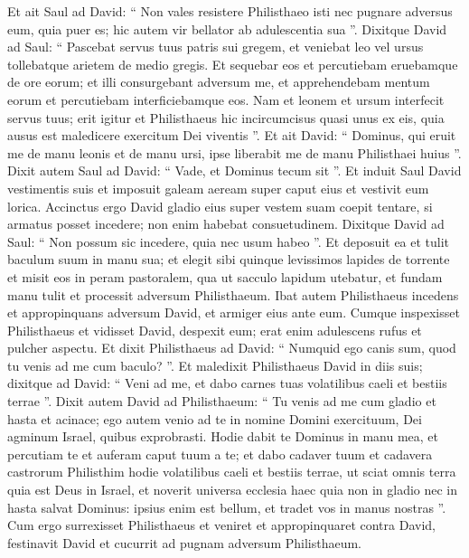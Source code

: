 \begin{biblechapter}
\begin{biblechapter}
\begin{biblechapter}
\begin{biblechapter}
\begin{biblechapter}
\begin{biblechapter}
\begin{biblechapter}
\begin{biblechapter}
\begin{biblechapter}
\begin{biblechapter}
\begin{biblechapter}
\begin{biblechapter}
\begin{biblechapter}
\begin{biblechapter}
\begin{biblechapter}
\begin{biblechapter}
\begin{biblechapter}
 \verse Et ait Saul ad David: “ Non vales resistere Philisthaeo isti nec pugnare adversus eum, quia puer es; hic autem vir bellator ab adulescentia sua ”. 
\verse Dixitque David ad Saul: “ Pascebat servus tuus patris sui gregem, et veniebat leo vel ursus tollebatque arietem de medio gregis. 
\verse Et sequebar eos et percutiebam eruebamque de ore eorum; et illi consurgebant adversum me, et apprehendebam mentum eorum et percutiebam interficiebamque eos. 
\verse Nam et leonem et ursum interfecit servus tuus; erit igitur et Philisthaeus hic incircumcisus quasi unus ex eis, quia ausus est maledicere exercitum Dei viventis ”. 
\verse Et ait David: “ Dominus, qui eruit me de manu leonis et de manu ursi, ipse liberabit me de manu Philisthaei huius ”. Dixit autem Saul ad David: “ Vade, et Dominus tecum sit ”.
 \verse Et induit Saul David vestimentis suis et imposuit galeam aeream super caput eius et vestivit eum lorica. 
\verse Accinctus ergo David gladio eius super vestem suam coepit tentare, si armatus posset incedere; non enim habebat consuetudinem. Dixitque David ad Saul: “ Non possum sic incedere, quia nec usum habeo ”. Et deposuit ea 
\verse et tulit baculum suum in manu sua; et elegit sibi quinque levissimos lapides de torrente et misit eos in peram pastoralem, qua ut sacculo lapidum utebatur, et fundam manu tulit et processit adversum Philisthaeum.
 \verse Ibat autem Philisthaeus incedens et appropinquans adversum David, et armiger eius ante eum. 
\verse Cumque inspexisset Philisthaeus et vidisset David, despexit eum; erat enim adulescens rufus et pulcher aspectu. 
\verse Et dixit Philisthaeus ad David: “ Numquid ego canis sum, quod tu venis ad me cum baculo? ”. Et maledixit Philisthaeus David in diis suis; 
\verse dixitque ad David: “ Veni ad me, et dabo carnes tuas volatilibus caeli et bestiis terrae ”. 
\verse Dixit autem David ad Philisthaeum: “ Tu venis ad me cum gladio et hasta et acinace; ego autem venio ad te in nomine Domini exercituum, Dei agminum Israel, quibus exprobrasti. 
\verse Hodie dabit te Dominus in manu mea, et percutiam te et auferam caput tuum a te; et dabo cadaver tuum et cadavera castrorum Philisthim hodie volatilibus caeli et bestiis terrae, ut sciat omnis terra quia est Deus in Israel, 
\verse et noverit universa ecclesia haec quia non in gladio nec in hasta salvat Dominus: ipsius enim est bellum, et tradet vos in manus nostras ”.
 \verse Cum ergo surrexisset Philisthaeus et veniret et appropinquaret contra David, festinavit David et cucurrit ad pugnam adversum Philisthaeum. 

\end{biblechapter}
\end{biblechapter}
\end{biblechapter}
\end{biblechapter}
\end{biblechapter}
\end{biblechapter}
\end{biblechapter}
\end{biblechapter}
\end{biblechapter}
\end{biblechapter}
\end{biblechapter}
\end{biblechapter}
\end{biblechapter}
\end{biblechapter}
\end{biblechapter}
\end{biblechapter}
\end{biblechapter}
